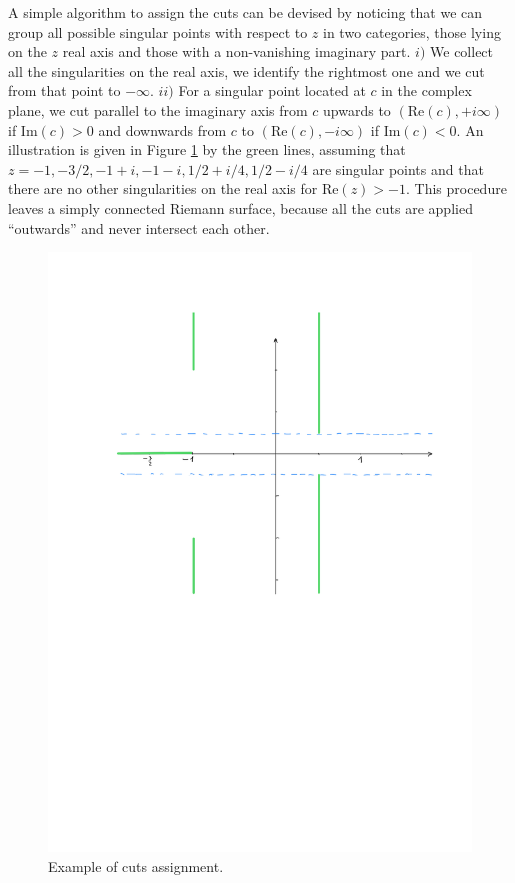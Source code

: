 A simple algorithm to assign the cuts can be devised by noticing that
we can group all possible singular points with respect to $z$
in two categories,
those lying on the $z$ real axis and those with a non-vanishing imaginary part.
$i)$ We collect all the singularities on the real axis,
we identify the rightmost one and we cut from that point to $-\infty$.
$ii)$ For a singular point located at $c$ in the complex plane,
we cut parallel to the imaginary axis
from $c$ upwards to $(\mathrm{Re}(c),+i \infty)$ if $\mathrm{Im}(c)>0$ and
downwards from $c$ to $(\mathrm{Re}(c),-i \infty)$ if $\mathrm{Im}(c)<0$.
An illustration is given in Figure \ref{fig:freestrip} by the green lines,
assuming that
$z=-1,-3/2,-1+i,-1-i,1/2+i/4,1/2-i/4$ are singular points and that
there are no other singularities on the real axis for $\mathrm{Re}(z)>-1$.
This procedure leaves a simply connected Riemann surface,
because all the cuts are applied ``outwards'' and never intersect each other.
\begin{figure}
\includegraphics[scale=0.45]{free-strip-ok.pdf}
\caption{\label{fig:freestrip}
  Example of cuts assignment.}
\end{figure}
